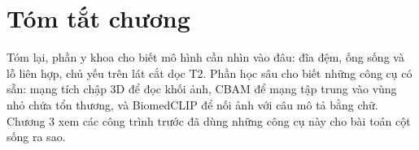 \section{Tóm tắt chương}

Tóm lại, phần y khoa cho biết mô hình cần nhìn vào đâu: đĩa đệm, ống sống và lỗ liên hợp, chủ yếu trên lát cắt dọc T2. Phần học sâu cho biết những công cụ có sẵn: mạng tích chập 3D để đọc khối ảnh, CBAM để mạng tập trung vào vùng nhỏ chứa tổn thương, và BiomedCLIP để nối ảnh với câu mô tả bằng chữ. Chương 3 xem các công trình trước đã dùng những công cụ này cho bài toán cột sống ra sao.
